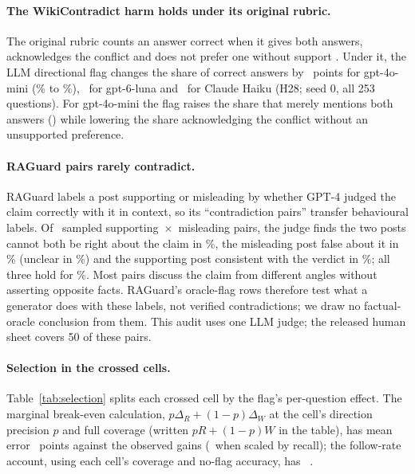 \paragraph{The WikiContradict harm holds under its original rubric.} The original rubric counts an answer correct when it gives
both answers, acknowledges the conflict and does not prefer one without support
\citep[\S3.4]{hou2024wikicontradict}. Under it, the LLM directional flag changes the share of correct answers
by \wikiOrigMiniEff\ points for gpt-4o-mini (\wikiOrigMiniPlain\% to \wikiOrigMiniDir\%), \wikiOrigLunaEff\ for
gpt-6-luna and \wikiOrigHaikuEff\ for Claude Haiku (H28; seed 0, all 253 questions). For gpt-4o-mini the flag raises the share that merely mentions both answers (\wikiBothMiniEff) while
lowering the share acknowledging the conflict without an unsupported preference.

\paragraph{RAGuard pairs rarely contradict.} RAGuard labels a post supporting or misleading by whether GPT-4 judged the claim correctly
with it in context, so its ``contradiction pairs'' transfer behavioural labels. Of \rgAudN\ sampled
supporting~$\times$~misleading pairs, the judge finds the two posts cannot both be right about the claim in
\rgAudContradict\%, the misleading post false about it in \rgAudBFalse\% (unclear in
\rgAudBUnclear\%) and the supporting post consistent with the verdict in \rgAudASupports\%; all three hold for
\rgAudVerified\%. Most pairs discuss the claim from different angles without asserting opposite
facts. RAGuard's oracle-flag rows therefore test what a generator does with these labels, not verified
contradictions; we draw no factual-oracle conclusion from them. This audit uses one LLM judge; the released
human sheet covers 50 of these pairs.


\paragraph{Selection in the crossed cells.} Table~\ref{tab:selection} splits each crossed cell by the flag's
per-question effect. The marginal break-even calculation, $p\Delta_R+(1-p)\Delta_W$ at the cell's direction precision
$p$ and full coverage (written $pR+(1-p)W$ in the table), has mean error \selMargMae\ points against the observed gains
(\selMargCovMae\ when scaled by recall); the follow-rate account, using each cell's coverage and no-flag accuracy, has
\predEightMae\ \predEightMaeCI.

